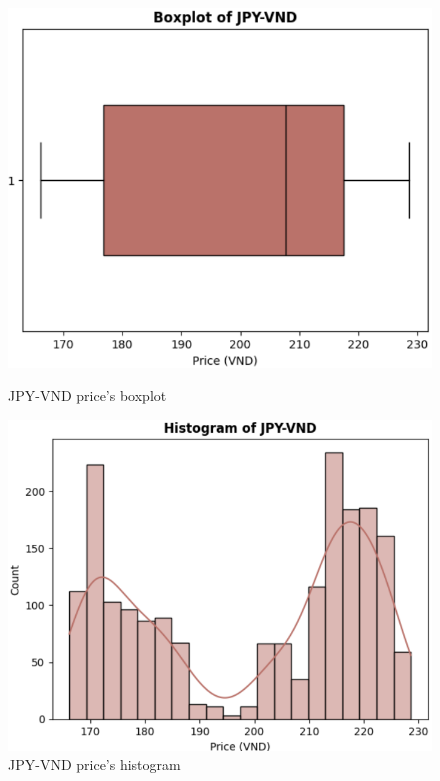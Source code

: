 \documentclass{ieeeojies}
\begin{document}
\begin{figure}[H]
    \centering
    \begin{minipage}{0.23\textwidth}
    \centering
    \includegraphics[width=1\textwidth]{Descriptive_statistic/jpy_boxplot.png}
    \caption{JPY-VND price's boxplot}
    \label{fig:1}
    \end{minipage}
    \hfill
    \begin{minipage}{0.23\textwidth}
    \centering
    \includegraphics[width=1\textwidth]{Descriptive_statistic/jpy_histogram.png}
    \caption{JPY-VND price's histogram}
    \label{fig:2}
    \end{minipage}
\end{figure}
\end{document}
